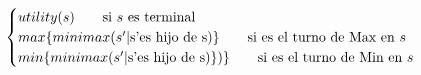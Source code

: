 \documentclass[preview]{standalone}
\begin{document}
\begin{align*}
\begin{cases}
                                 utility(s) \qquad \text{si $s$ es terminal} \cr
                                 max\{minimax(\text{$s'$}| $s'$ \text{es hijo de }$s$)\}\qquad \text{si es el turno de Max en $s$} \cr
                                 min\{minimax(\text{$s'$}| $s'$ \text{es hijo de }$s$)\})\}\qquad \text{si es el turno de Min en $s$} \cr
                                 \end{cases}
\end{align*}
\end{document}
